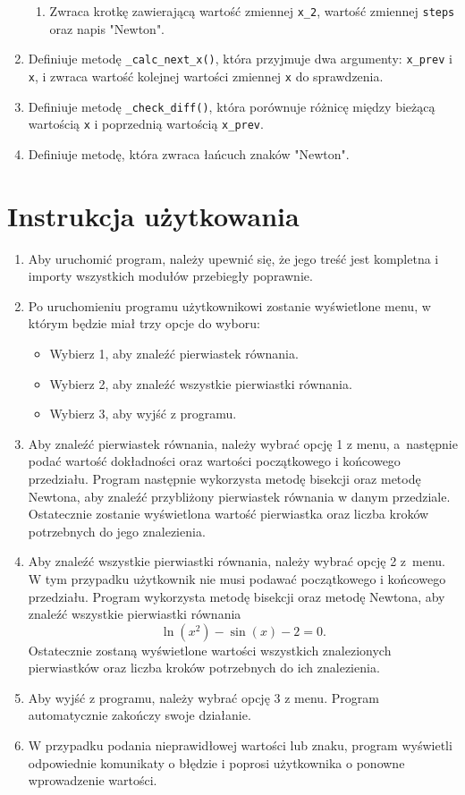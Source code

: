 \documentclass[12pt]{article}
\begin{document}
\begin{enumerate}
\begin{enumerate}
\item Zwraca krotkę zawierającą wartość zmiennej \verb|x_2|, wartość zmiennej \verb|steps| oraz napis "Newton".
\end{enumerate}
\item Definiuje metodę \verb|_calc_next_x()|, która przyjmuje dwa argumenty: \verb|x_prev| i \verb|x|, i zwraca wartość kolejnej wartości zmiennej \verb|x| do sprawdzenia.
\item Definiuje metodę \verb|_check_diff()|, która porównuje różnicę między bieżącą wartością \verb|x| i poprzednią wartością \verb|x_prev|.
\item Definiuje metodę, która zwraca łańcuch znaków "Newton".

\end{enumerate}
\section{Instrukcja użytkowania}
\begin{enumerate}
\item Aby uruchomić program, należy upewnić się, że jego treść jest kompletna i importy wszystkich modułów przebiegły poprawnie.
\item Po uruchomieniu programu użytkownikowi zostanie wyświetlone menu, w którym będzie miał trzy opcje do wyboru:
\begin{itemize}
\item Wybierz 1, aby znaleźć pierwiastek równania.
\item Wybierz 2, aby znaleźć wszystkie pierwiastki równania.
\item Wybierz 3, aby wyjść z programu.
\end{itemize}
\item Aby znaleźć pierwiastek równania, należy wybrać opcję 1 z menu, a~następnie podać wartość dokładności oraz wartości początkowego i końcowego przedziału. Program następnie wykorzysta metodę bisekcji oraz metodę Newtona, aby znaleźć przybliżony pierwiastek równania w danym przedziale. Ostatecznie zostanie wyświetlona wartość pierwiastka oraz liczba kroków potrzebnych do jego znalezienia.
\item Aby znaleźć wszystkie pierwiastki równania, należy wybrać opcję 2 z~menu. W tym przypadku użytkownik nie musi podawać początkowego i końcowego przedziału. Program wykorzysta metodę bisekcji oraz metodę Newtona, aby znaleźć wszystkie pierwiastki równania $$\ln(x^2) - \sin(x) - 2 = 0.$$Ostatecznie zostaną wyświetlone wartości wszystkich znalezionych pierwiastków oraz liczba kroków potrzebnych do ich znalezienia.
\item Aby wyjść z programu, należy wybrać opcję 3 z menu. Program automatycznie zakończy swoje działanie.
\item W przypadku podania nieprawidłowej wartości lub znaku, program wyświetli odpowiednie komunikaty o błędzie i poprosi użytkownika o ponowne wprowadzenie wartości.

\end{enumerate}
\end{document}
